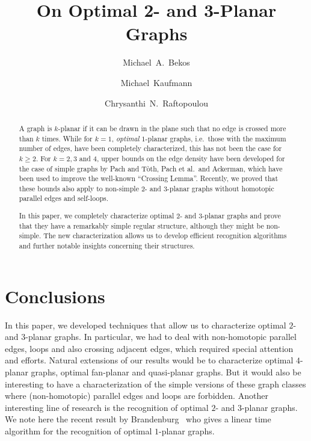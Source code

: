 \documentclass[a4paper,UKenglish]{lipics-v2016}
\title{On Optimal 2- and 3-Planar Graphs}
\author[1]{Michael~A.~Bekos}
\author[1]{Michael~Kaufmann}
\author[2]{Chrysanthi~N.~Raftopoulou}
\affil[1]{
Wilhelm-Schickhard-Institut f\"ur Informatik, Universit\"at T\"ubingen, Germany\\
\texttt{\{bekos,mk\}@informatik.uni-tuebingen.de}}
\affil[2]{
School of Applied Mathematical \& Physical Sciences, NTUA, Greece\\
\texttt{crisraft@mail.ntua.gr}}
\theoremstyle{plain}
\begin{document}
\maketitle

\begin{abstract}
A graph is $k$-planar if it can be drawn in the plane such that no edge is crossed more than $k$ times. While for $k=1$, \emph{optimal} $1$-planar graphs, i.e.\ those with the maximum number of edges, have been completely characterized, this has not been the case for $k \geq 2$. For $k=2,3$ and $4$, upper bounds on the edge density have been developed for the case of simple graphs by Pach and Tòth, Pach et al.\ and Ackerman, which have been used to improve the well-known ``Crossing Lemma''. Recently, we proved that these bounds also apply to non-simple $2$- and $3$-planar graphs without homotopic parallel edges and self-loops.

In this paper, we completely characterize optimal $2$- and $3$-planar graphs and prove that they have a remarkably simple regular structure, although they might be non-simple. The new characterization allows us to develop efficient recognition algorithms and further notable insights concerning their structures.
\end{abstract}








\section{Conclusions}
\label{sec:conclusions}

In this paper, we developed techniques that allow us to characterize optimal $2$- and $3$-planar graphs. In particular, we had to deal with non-homotopic parallel edges, loops and also crossing adjacent edges, which required special attention and efforts. Natural extensions of our results would be to characterize optimal $4$-planar graphs, optimal fan-planar and quasi-planar graphs. But it would also be interesting to have a characterization of the simple versions of these graph classes where (non-homotopic) parallel edges and loops are forbidden. Another interesting line of research is the recognition of optimal $2$- and $3$-planar graphs. We note here the recent result by Brandenburg~\cite{DBLP:journals/corr/Brandenburg16a} who gives a linear time algorithm for the recognition of optimal $1$-planar graphs.
\end{document}
